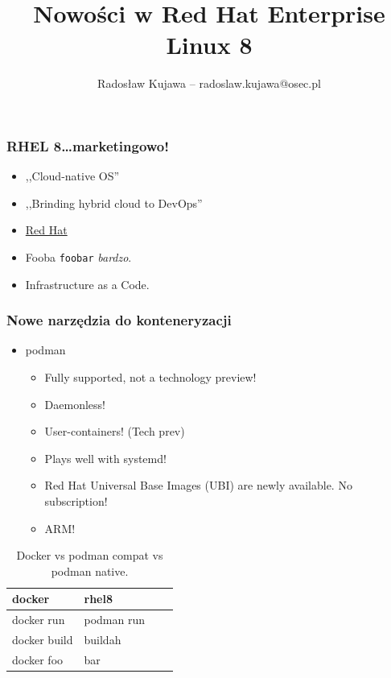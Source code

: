 \documentclass[dvipsnames,table]{beamer}
\title{Nowości w Red Hat Enterprise Linux 8}
\author{Radosław Kujawa -- radoslaw.kujawa@osec.pl}
\institute{OSEC}
\begin{document}
\begin{frame}
	\titlepage
\end{frame}

\begin{frame}
\frametitle{RHEL 8\ldots marketingowo!}
\begin{itemize}
	\item ,,Cloud-native OS''
	\item ,,Brinding hybrid cloud to DevOps''
	\item \href{http://www.redhat.com}{Red Hat}
	\item Fooba {\tt foobar} {\em bardzo}.
	\item Infrastructure as a Code.
\end{itemize}
\begin{center}
\end{center}
\end{frame}








%

\begin{frame}[fragile]
	\frametitle{Nowe narzędzia do konteneryzacji}
\begin{table}[]
\begin{itemize}
	\item podman
	\begin{itemize}
		\item Fully supported, not a technology preview!
		\item Daemonless!
		\item User-containers! (Tech prev)
		\item Plays well with systemd!
		\item Red Hat Universal Base Images (UBI) are newly available. No subscription!
		\item ARM!
	\end{itemize}
\end{itemize}
\centering
\caption{Docker vs podman compat vs podman native.}
\label{porownanie}
\scriptsize
\begin{tabular}{llll}
\hline
docker & rhel8    \\ \hline
docker run & podman run \\
docker build & buildah  \\
docker foo & bar \\ \hline
\end{tabular}
\normalsize
\end{table}
\end{frame}
\end{document}
